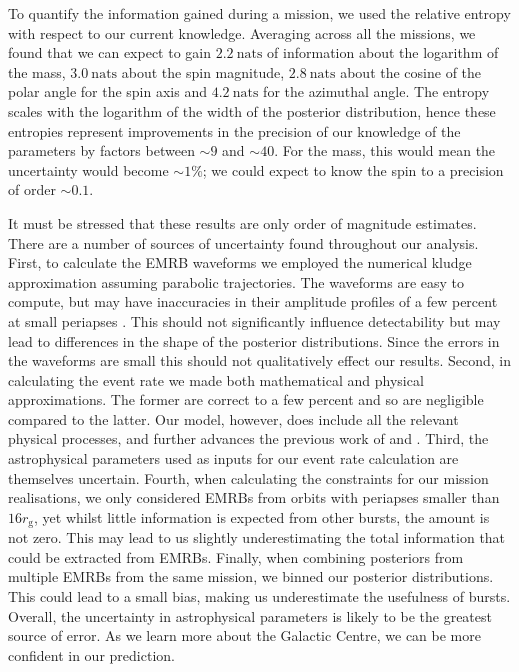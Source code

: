 \documentclass[useAMS,usedcolumn,usegraphicx,usenatbib]{mn2e}
\newcommand{\units}[1]{\ensuremath{~\mathrm{#1}}}
\newcommand{\sub}[1]{\ensuremath{_\mathrm{#1}}}
\begin{document}
To quantify the information gained during a mission, we used the relative entropy with respect to our current knowledge. Averaging across all the missions, we found that we can expect to gain $2.2\units{nats}$ of information about the logarithm of the mass, $3.0\units{nats}$ about the spin magnitude, $2.8\units{nats}$ about the cosine of the polar angle for the spin axis and $4.2\units{nats}$ for the azimuthal angle. The entropy scales with the logarithm of the width of the posterior distribution, hence these entropies represent improvements in the precision of our knowledge of the parameters by factors between $\sim9$ and $\sim40$. For the mass, this would mean the uncertainty would become $\sim1\%$; we could expect to know the spin to a precision of order $\sim0.1$.

It must be stressed that these results are only order of magnitude estimates. There are a number of sources of uncertainty found throughout our analysis. First, to calculate the EMRB waveforms we employed the numerical kludge approximation assuming parabolic trajectories. The waveforms are easy to compute, but may have inaccuracies in their amplitude profiles of a few percent at small periapses \citep{Berry2013}. This should not significantly influence detectability but may lead to differences in the shape of the posterior distributions. Since the errors in the waveforms are small this should not qualitatively effect our results. Second, in calculating the event rate we made both mathematical and physical approximations. The former are correct to a few percent and so are negligible compared to the latter. Our model, however, does include all the relevant physical processes, and further advances the previous work of \citet{Rubbo2006} and \citet{Hopman2007}. Third, the astrophysical parameters used as inputs for our event rate calculation are themselves uncertain. Fourth, when calculating the constraints for our mission realisations, we only considered EMRBs from orbits with periapses smaller than $16 r\sub{g}$, yet whilst little information is expected from other bursts, the amount is not zero. This may lead to us slightly underestimating the total information that could be extracted from EMRBs. Finally, when combining posteriors from multiple EMRBs from the same mission, we binned our posterior distributions. This could lead to a small bias, making us underestimate the usefulness of bursts. Overall, the uncertainty in astrophysical parameters is likely to be the greatest source of error. As we learn more about the Galactic Centre, we can be more confident in our prediction.
\end{document}
